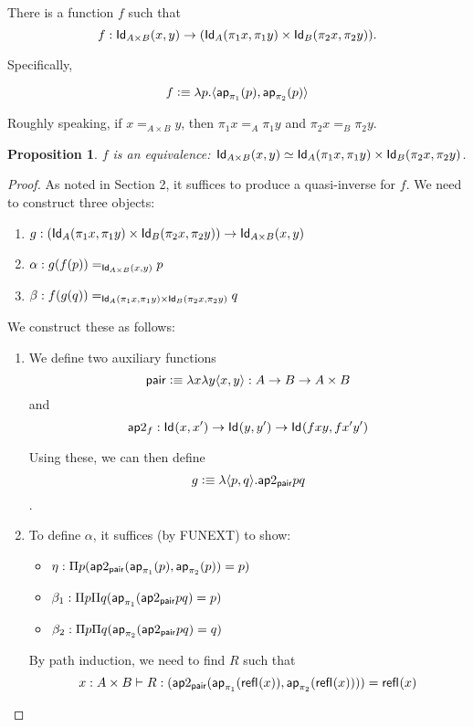 \documentclass[12pt]{article}
\newcommand{\ap}{\mathsf{ap}}
\newtheorem*{proposition}{Proposition}
\begin{document}
There is a function $f$ such that
$$f: \mathsf{Id}_{A\times B}(x,y) \to (\mathsf{Id}_{A}(\pi_1 x, \pi_1 y) \times \mathsf{Id}_{B}(\pi_2 x,\pi_2 y)).$$

Specifically,

$$f\defeq \lambda p.\langle \ap_{\pi_1} (p) , \ap_{\pi_2} (p) \rangle$$

Roughly speaking, if $x =_{A\times B} y$, then $\pi_1 x =_A \pi_1 y$ and $\pi_2 x =_B \pi_2 y$.

\begin{proposition} $f$ is an equivalence:
 $\mathsf{Id}_{A\times B}(x,y) \simeq \mathsf{Id}_{A}(\pi_1 x, \pi_1 y) \times \mathsf{Id}_{B}(\pi_2 x, \pi_2 y)$.
\end{proposition}

\begin{proof}
 As noted in Section 2, it suffices to produce a quasi-inverse for $f$.
 We need to construct three objects:
 \begin{enumerate}
  \item $g: ( \mathsf{Id}_{A}(\pi_1 x, \pi_1 y) \times \mathsf{Id}_{B}(\pi_2 x, \pi_2 y) ) \to \mathsf{Id}_{A\times B} (x,y)$
  \item $\alpha: g(f(p)) =_{\mathsf{Id}_{A\times B} (x,y)} p$
  \item $\beta: f(g(q)) =_{\mathsf{Id}_{A}(\pi_1 x,\pi_1 y)\times \mathsf{Id}_{B}(\pi_2 x,\pi_2 y)} q$
 \end{enumerate}
 We construct these as follows:
 \begin{enumerate}
  \item We define two auxiliary functions
  $$\mathsf{pair} \vcentcolon\equiv \lambda x \lambda y \langle x, y \rangle : A\to B\to A\times B$$
  and
  $$\ap2_f: \Id{}(x,x') \to \Id{}(y,y') \to \Id{}(f x y, f x' y')$$ 
  
  Using these, we can then define
  $$g\defeq \lambda \langle p,q \rangle .\ap2_\pair p q$$.
  
  \item To define $\alpha$, it suffices (by FUNEXT) to show:
  \begin{itemize}
   \item $\eta: \Pi p(\ap2_\pair (\ap_{\pi_1}(p), \ap_{\pi_2}(p)) = p)$
   \item $\beta_1: \Pi p \Pi q (\ap_{\pi_1} (\ap2_\pair p q) = p)$
   \item $\beta_2: \Pi p \Pi q (\ap_{\pi_2} (\ap2_\pair p q) = q)$
  \end{itemize}

  By path induction, we need to find $R$ such that
  $$x:A\times B \entails R:(\ap2_\pair(\ap_{\pi_1}(\refl{}(x)),\ap_{\pi_2}(\refl{}(x))))=\refl{}(x)$$
  

\end{enumerate}
\end{proof}
\end{document}
